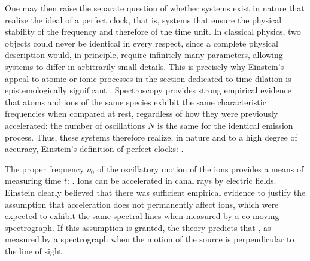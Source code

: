 \documentclass[pdflatex,sn-basic]{sn-jnl}
\newcommand{\me}{; my emphasis}
\begin{document}
One may then raise the separate question of whether systems exist in nature that realize the ideal of a perfect clock, that is, systems that ensure the physical stability of the frequency and therefore of the time unit. In classical physics, two objects could never be identical in every respect, since a complete physical description would, in principle, require infinitely many parameters, allowing systems to differ in arbitrarily small details. This is precisely why Einstein’s appeal to atomic or ionic processes in the section dedicated to time dilation is epistemologically significant \citep{Pierseaux2003}. Spectroscopy provides strong empirical evidence that atoms and ions of the same species exhibit the same characteristic frequencies when compared at rest, regardless of how they were previously accelerated: the number of oscillations $N$ is the same for the identical emission process. Thus, these systems therefore realize, in nature and to a high degree of accuracy, Einstein's definition of perfect clocks:  \citep[132--33]{Einstein1910}.

The proper frequency $\nu_0$ of the oscillatory motion of the ions provides a means of measuring time $t$:  \citep[133]{Einstein1910}. Ions can be accelerated in canal rays by electric fields. Einstein clearly believed that there was sufficient empirical evidence to justify the assumption that acceleration does not permanently affect ions, which were expected to exhibit the same spectral lines when measured by a co-moving spectrograph. If this assumption is granted, the theory predicts that  \citep[133\me]{Einstein1910}, as measured by a spectrograph when the motion of the source is perpendicular to the line of sight.
\end{document}
